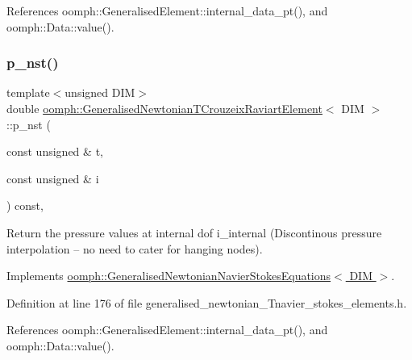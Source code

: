 References oomph\+::\+Generalised\+Element\+::internal\+\_\+data\+\_\+pt(), and oomph\+::\+Data\+::value().

\mbox{\label{classoomph_1_1GeneralisedNewtonianTCrouzeixRaviartElement_a8338447861d4a7757eafc8eeda941643}} 
\subsubsection{\texorpdfstring{p\+\_\+nst()}{p\_nst()}\hspace{0.1cm}{\footnotesize\ttfamily [2/2]}}
{\footnotesize\ttfamily template$<$unsigned D\+IM$>$ \\
double \hyperlink{classoomph_1_1GeneralisedNewtonianTCrouzeixRaviartElement}{oomph\+::\+Generalised\+Newtonian\+T\+Crouzeix\+Raviart\+Element}$<$ D\+IM $>$\+::p\+\_\+nst (\begin{DoxyParamCaption}\item[{const unsigned \&}]{t,  }\item[{const unsigned \&}]{i }\end{DoxyParamCaption}) const\hspace{0.3cm}{\ttfamily [inline]}, {\ttfamily [virtual]}}



Return the pressure values at internal dof i\+\_\+internal (Discontinous pressure interpolation -- no need to cater for hanging nodes). 



Implements \hyperlink{classoomph_1_1GeneralisedNewtonianNavierStokesEquations_a82eebde146ffb1b65a6c1ed8583c87f6}{oomph\+::\+Generalised\+Newtonian\+Navier\+Stokes\+Equations$<$ D\+I\+M $>$}.



Definition at line 176 of file generalised\+\_\+newtonian\+\_\+\+Tnavier\+\_\+stokes\+\_\+elements.\+h.



References oomph\+::\+Generalised\+Element\+::internal\+\_\+data\+\_\+pt(), and oomph\+::\+Data\+::value().

\mbox{\label{classoomph_1_1GeneralisedNewtonianTCrouzeixRaviartElement_aa5b24d0755232d850281523741ea7f1b}} 
